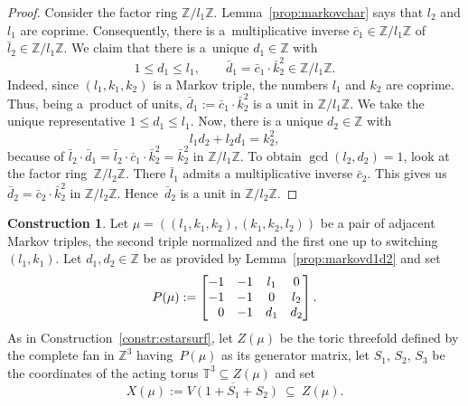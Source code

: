 \documentclass[pdftex]{sigma}
\theoremstyle{definition}
\newtheorem{constr}[thm]{Construction}
\def\TT{{\mathbb T}}
\def\ZZ{{\mathbb Z}}
\begin{document}
\begin{proof}
Consider the factor ring $\ZZ / l_1\ZZ$.
Lemma~\ref{prop:markovchar} says that
$l_2$ and $l_1$ are coprime.
Consequently, there is a~multiplicative inverse
$\bar c_1 \in \ZZ / l_1\ZZ$ of $\bar l_2 \in \ZZ / l_1\ZZ$.
We claim that there is a~unique $d_1 \in \ZZ$ with
\[
1 \le d_1 \le l_1,
\qquad
\bar d_1 = \bar c_1 \cdot \bar k_2^2 \in \ZZ / l_1\ZZ.
\]
Indeed, since $(l_1,k_1,k_2)$ is a Markov triple,
the numbers $l_1$ and $k_2$ are coprime.
Thus, being a~product of units,
$\bar d_1 := \bar c_1 \cdot \bar k_2^2$
is a unit in $\ZZ / l_1\ZZ$.
We take the unique representative $1 \le d_1 \le l_1$.
Now, there is a unique $d_2 \in \ZZ$ with
\[
l_1d_2 + l_2d_1 = k_2^2,
\]
because of
$\bar l_2 \cdot \bar d_1 = \bar l_2 \cdot \bar c_1 \cdot \bar k_2^2 = \bar k_2^2$
in $\ZZ / l_1\ZZ$.
To obtain $\gcd(l_2,d_2)=1$, look at the factor ring~$\ZZ/l_2\ZZ$.
There $\bar l_1$ admits a multiplicative inverse $\bar c_2$.
This gives us $\bar d_2 = \bar c_2 \cdot \bar k_2^2$ in $\ZZ/l_2\ZZ$.
Hence~$\bar d_2$ is a unit in $\ZZ/l_2\ZZ$.
\end{proof}



\begin{constr}
\label{constr:markovsurface}
Let $\mu = ((l_1,k_1,k_2), (k_1,k_2,l_2))$
be a pair of adjacent Markov triples,
the second triple normalized
and the first one up to switching $(l_1,k_1)$.
Let $d_1, d_2 \in \ZZ$ be as provided
by Lemma~\ref{prop:markovd1d2} and set
\[
P(\mu)
 :=
\begin{bmatrix}
-1 & -1 & l_1 & 0
\\
-1 & -1 & 0 & l_2
\\
\hphantom{-} 0 & -1 & d_1 & d_2
\end{bmatrix}.
\]
As in Construction~\ref{constr:cstarsurf},
let $Z(\mu)$ be the toric threefold defined
by the complete fan in $\ZZ^3$ having~$P(\mu)$
as its generator matrix, let $S_1$, $S_2$, $S_3$ be
the coordinates of the acting torus
$\TT^3 \subseteq Z(\mu)$ and set
\[
X (\mu) := \overline{V(1+S_1+S_2)} \ \subseteq \ Z(\mu).
\]
\end{constr}
\end{document}
